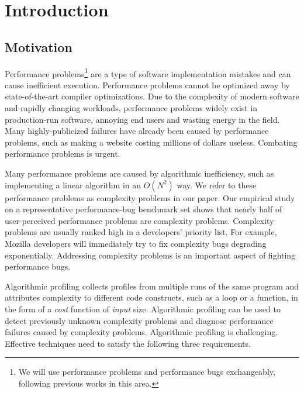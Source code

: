 \section{Introduction}
\label{sec:intro}

\subsection{Motivation}
\label{sec:motiv}

Performance problems\footnote{We will use performance problems and performance bugs exchangeably,
following previous works in this area\cite{SongOOPSLA2014,ldoctor}.}
are a type of software implementation mistakes
and can cause inefficient execution\cite{PerfBug,perf.fse10,SongOOPSLA2014,ldoctor,Alabama}.
Performance problems cannot be optimized away by state-of-the-art compiler optimizations.
Due to the complexity of modern software and rapidly changing workloads,
performance problems widely exist in production-run software,
annoying end users and wasting energy in the field\cite{PerfBug,SongOOPSLA2014,ldoctor}. 
Many highly-publicized failures have already been caused by performance problems,
such as making a website costing millions of dollars useless\cite{ACA-health}.
Combating performance problems is urgent.

Many performance problems are caused by algorithmic inefficiency,
such as implementing a linear algorithm in an $O(N^2)$ way.
We refer to these performance problems as complexity problems in our paper.
Our empirical study on a representative performance-bug
benchmark set\cite{PerfBug,SongOOPSLA2014} shows that
nearly half of user-perceived performance problems are complexity problems.
Complexity problems are usually ranked high in a developers' priority list.
For example, Mozilla developers will immediately try to fix complexity bugs degrading exponentially\cite{mozilla35294}.
Addressing complexity problems is an important aspect of fighting performance bugs.


Algorithmic profiling\cite{Aprof1,Aprof2,AlgoProf} collects profiles from multiple
runs of the same program and attributes complexity to different code constructs, such as a loop or a function,
in the form of a \textit{cost} function of \textit{input} size.
Algorithmic profiling can be used to detect previously unknown complexity problems and
diagnose performance failures caused by complexity problems.
Algorithmic profiling is challenging.
Effective techniques need to satisfy the following three requirements.

